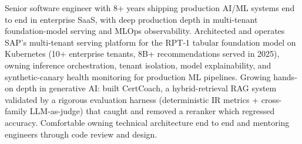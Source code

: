 
\begin{cvparagraph}
Senior software engineer with 8+ years shipping production AI/ML systems end to end in enterprise SaaS, with deep production depth in multi-tenant foundation-model serving and MLOps observability. Architected and operates SAP's multi-tenant serving platform for the RPT-1 tabular foundation model on Kubernetes (10+ enterprise tenants, 8B+ recommendations served in 2025), owning inference orchestration, tenant isolation, model explainability, and synthetic-canary health monitoring for production ML pipelines. Growing hands-on depth in generative AI: built CertCoach, a hybrid-retrieval RAG system validated by a rigorous evaluation harness (deterministic IR metrics + cross-family LLM-as-judge) that caught and removed a reranker which regressed accuracy. Comfortable owning technical architecture end to end and mentoring engineers through code review and design.
\end{cvparagraph}
